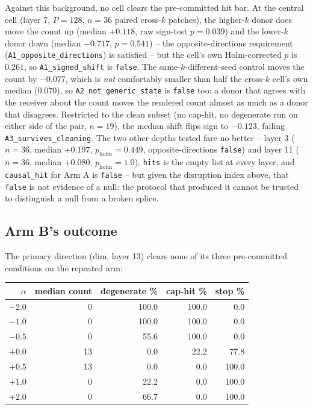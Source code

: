 \documentclass[11pt]{article}
\begin{document}
Against this background, no cell clears the pre-committed hit bar. At the
central cell (layer 7, $P{=}128$, $n{=}36$ paired cross-$k$ patches), the
higher-$k$ donor does move the count up (median $+0.118$, raw sign-test
$p{=}0.039$) and the lower-$k$ donor down (median $-0.717$, $p{=}0.541$) --
the opposite-directions requirement (\texttt{A1\_opposite\_directions}) is
satisfied -- but the cell's own Holm-corrected $p$ is $0.261$, so
\texttt{A1\_signed\_shift} is \texttt{false}. The same-$k$-different-seed
control moves the count by $-0.077$, which is \emph{not} comfortably smaller
than half the cross-$k$ cell's own median ($0.070$), so
\texttt{A2\_not\_generic\_state} is \texttt{false} too: a donor that agrees
with the receiver about the count moves the rendered count almost as much as a
donor that disagrees. Restricted to the clean subset (no cap-hit, no
degenerate run on either side of the pair, $n{=}19$), the median shift flips
sign to $-0.123$, failing \texttt{A3\_survives\_cleaning}. The two other depths
tested fare no better -- layer 3 ($n{=}36$, median $+0.197$, $p_{\text{holm}}{=}0.449$,
opposite-directions \texttt{false}) and layer 11 ($n{=}36$, median $+0.080$,
$p_{\text{holm}}{=}1.0$). \texttt{hits} is the empty list at every layer, and
\texttt{causal\_hit} for Arm A is \texttt{false} -- but given the disruption
index above, that \texttt{false} is not evidence of a null: the protocol that
produced it cannot be trusted to distinguish a null from a broken splice.

\subsection{Arm B's outcome}

The primary direction (dim, layer 13) clears none of its three pre-committed
conditions on the repeated arm:

\begin{center}
\begin{tabular}{rrrrr}
\toprule
$\alpha$ & median count & degenerate \% & cap-hit \% & stop \% \\
\midrule
$-2.0$ & 0  & 100.0 & 100.0 &   0.0 \\
$-1.0$ & 0  & 100.0 & 100.0 &   0.0 \\
$-0.5$ & 0  &  55.6 & 100.0 &   0.0 \\
$+0.0$ & 13 &   0.0 &  22.2 &  77.8 \\
$+0.5$ & 13 &   0.0 &   0.0 & 100.0 \\
$+1.0$ & 0  &  22.2 &   0.0 & 100.0 \\
$+2.0$ & 0  &  66.7 &   0.0 & 100.0 \\
\bottomrule
\end{tabular}
\end{center}
\end{document}
